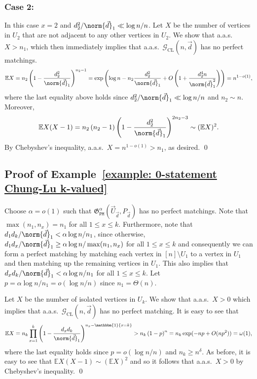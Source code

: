 \documentclass[12pt]{article}
\def\ex{{\mathbb E}}
\begin{document}
\subsubsection{Case 2: }
In this case $x=2$ and $d_2^2/\norm{\vec{d}}_1\ll\log n/n$. Let $X$ be the number of vertices in $U_2$ that are not adjacent to any other vertices in $U_2$. We show that a.a.s.\ $X>n_1$, which then immediately implies that a.a.s.\ $\mathcal{G}_{\text{CL}}(n,\vec{d})$ has no perfect matchings.
\[
\ex X = n_2\displaystyle\left(1 - \frac{d_2^2}{\norm{\vec{d}}_1}\right)^{n_2-1} = \exp\left(\log n -n_2 \frac{d_2^2}{\norm{\vec{d}}_1} +O\left(1+\frac{d_2^4n}{\norm{\vec{d}}_1^2}\right)\right) =n^{1-o(1)},
\]
where the last equality above holds since $d_2^2/\norm{\vec{d}}_1\ll\log n/n$ and $n_2\sim n$.
Moreover,
\[
\ex X(X-1)=n_2\left(n_2 - 1\right)\left(1-\frac{d_2^2}{\norm{\vec{d}}_1}\right)^{2n_2-3} \sim (\ex X)^2.
\]
By Chebyshev's inequality, a.a.s.\ $X=n^{1-o(1)}>n_1$, as desired.  \qed


\subsection{Proof of Example~\ref{example: 0-statement Chung-Lu k-valued}}
\label{section: Proof of k-valued Chung-Lu}

Choose $\alpha = o(1)$ such that $\mathfrak{G}_{\texttt{PM}}^{\alpha}\left(\vec{U}_{\vec{d}}, P_{\vec{d}}\right)$ has no perfect matchings. Note that $ \max(n_1, n_x)=n_1$ for all $1\leq x\leq k$. Furthermore, note that $d_1 d_k/\norm{\vec{d}}_1 < \alpha\log n/n_1$, since otherwise, $d_1 d_x/\norm{\vec{d}}_1\geq\alpha\log n/\max(n_1, n_x)$ for all $1\leq x\leq k$ and consequently we can form a perfect matching by matching each vertex in $[n]\setminus U_1$ to a vertex in $U_1$ and then matching up the remaining vertices in $U_1$. This also implies that $d_x d_k/\norm{\vec{d}}_1 < \alpha\log n/n_1$ for all $1\leq x\leq k$. Let $p = \alpha\log n/n_1 = o(\log n/n)$ since $n_1 = \Theta(n)$.

Let $X$ be the number of isolated vertices in $U_k$. We show that a.a.s.\ $X > 0$ which implies that a.a.s.\ $\mathcal{G}_{\text{CL}}(n,\vec{d})$ has no perfect matching. It is easy to see that
\[
\ex X = n_k\prod\limits_{x = 1}^{k} \left(1 - \frac{d_x d_k}{\norm{\vec{d}}_1}\right)^{n_x-\mathbbm{1}\{x = k\}} > n_k\left(1-p\right)^n = n_k\exp(-np + O(np^2)) = \omega(1),
\]
where the last equality holds since $p = o(\log n/n)$ and $n_k \ge n^{\delta}$. As before, it is easy to see that $\ex X(X-1)\sim (\ex X)^2$ and so it follows that a.a.s.\ $X > 0$ by Chebyshev's inequality.
\qed
\end{document}

